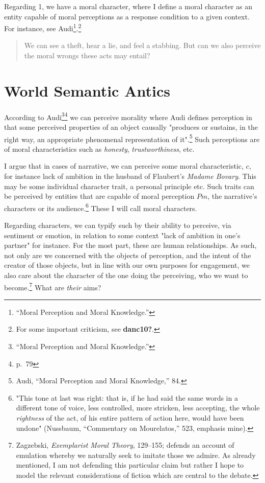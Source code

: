 \documentclass[
  12pt,
]{book}
\theoremstyle{definition}
\theoremstyle{definition}
\theoremstyle{definition}
\theoremstyle{definition}
\theoremstyle{remark}
\begin{document}
Regarding 1, we have a moral character, where I define a moral character as an entity capable of moral perceptions as a response condition to a given context. For instance, see Audi\footnote{{``Moral {Perception} and {Moral Knowledge}.''}}.\footnote{For some important criticism, see \textbf{danc10?}.}

\begin{quote}
We can see a theft, hear a lie, and feel a stabbing. But can we also perceive the moral wrongs these acts may entail?
\end{quote}

\section{World Semantic Antics}\label{world-semantic-antics}

According to Audi\footnote{{``Moral {Perception} and {Moral Knowledge}.''}}\footnote{p.~79} we can perceive morality where Audi defines perception in that some perceived properties of an object causally "produces or sustains, in the right way, an appropriate phenomenal representation of it".\footnote{Audi, {``Moral {Perception} and {Moral Knowledge},''} 84.} Such perceptions are of moral characteristics such as \emph{honesty}, \emph{trustworthiness}, etc.

I argue that in cases of narrative, we can perceive some moral characteristic, \(c\), for instance lack of ambition in the husband of Flaubert's \emph{Madame Bovary}. This may be some individual character trait, a personal principle etc. Such traits can be perceived by entities that are capable of moral perception \(Pm\), the narrative's characters or its audience.\footnote{"\textquotesingle This tone at last was right\textquotesingle: that is, if he had said the same words in a different tone of voice, less controlled, more stricken, less accepting, the whole \emph{rightness} of the act, of his entire pattern of action here, would have been undone" (Nussbaum, {``Commentary on {Mourelatos},''} 523, emphasis mine).} These I will call moral characters.

Regarding characters, we can typify such by their ability to perceive, via sentiment or emotion, in relation to some context "lack of ambition in one's partner" for instance. For the most part, these are human relationships. As such, not only are we concerned with the objects of perception, and the intent of the creator of those objects, but in line with our own purposes for engagement, we also care about the character of the one doing the perceiving, who we want to become.\footnote{Zagzebski, \emph{Exemplarist {Moral Theory}}, 129--155; defends an account of emulation whereby we naturally seek to imitate those we admire. As already mentioned, I am not defending this particular claim but rather I hope to model the relevant considerations of fiction which are central to the debate.} What are \emph{their} aims?
\end{document}
